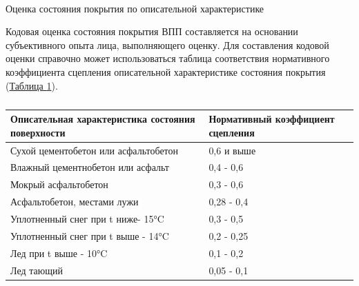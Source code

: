\paragraph{} Оценка состояния покрытия по описательной характеристике 

Кодовая оценка состояния покрытия ВПП составляется на основании субъективного опыта лица, выполняющего оценку. Для составления кодовой оценки справочно может использоваться таблица соответствия нормативного коэффициента сцепления описательной характеристике состояния покрытия (\hyperref[tbl:04T4]{Таблица \ref*{tbl:04T4}}). 

\begin{table}[H]
    \begin{center}
    \caption{} \label{tbl:04T4}
    \small
    \begin{tabular}{|p{}|p{}|}
    \hline
    Описательная характеристика состояния поверхности	&Нормативный коэффициент сцепления\\
    \hline    
    Сухой цементобетон или асфальтобетон	            &0,6 и выше\\
    Влажный цементнобетон или асфальт	                &0,4 - 0,6\\
    Мокрый асфальтобетон	                            &0,3 - 0,6\\
    Асфальтобетон, местами лужи	                        &0,28 - 0,4\\
    Уплотненный снег при t ниже- 15°C	                &0,3 - 0,5\\
    Уплотненный снег при t выше - 14°C	                &0,2 - 0,25\\
    Лед при t выше - 10°C	                            &0,1 - 0,2\\
    Лед тающий	                                        &0,05 - 0,1\\
    \hline\hline
    \end{tabular}
    \end{center}
\end{table}

